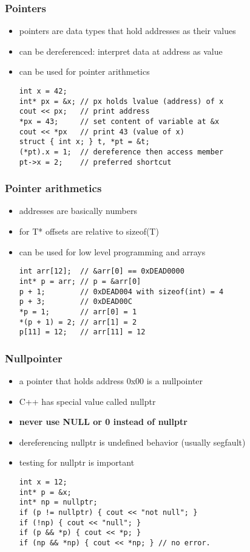 \begin{frame}[fragile]
    \frametitle{Pointers}
    \begin{itemize}
        \item pointers are data types that hold addresses as their values
        \item can be dereferenced: interpret data at address as value
        \item can be used for pointer arithmetics
        \begin{lstlisting}
int x = 42;
int* px = &x; // px holds lvalue (address) of x
cout << px;   // print address
*px = 43;     // set content of variable at &x
cout << *px   // print 43 (value of x)
struct { int x; } t, *pt = &t;
(*pt).x = 1;  // dereference then access member
pt->x = 2;    // preferred shortcut
        \end{lstlisting}
    \end{itemize}
\end{frame}

\begin{frame}[fragile]
    \frametitle{Pointer arithmetics}
    \begin{itemize}
        \item addresses are basically numbers
        \item for T* offsets are relative to sizeof(T)
        \item can be used for low level programming and arrays
        \begin{lstlisting}
int arr[12];  // &arr[0] == 0xDEAD0000
int* p = arr; // p = &arr[0]
p + 1;        // 0xDEAD004 with sizeof(int) = 4
p + 3;        // 0xDEAD00C
*p = 1;       // arr[0] = 1
*(p + 1) = 2; // arr[1] = 2
p[11] = 12;   // arr[11] = 12
        \end{lstlisting}
    \end{itemize}
\end{frame}

\begin{frame}[fragile]
    \frametitle{Nullpointer}
    \begin{itemize}
        \item a pointer that holds address 0x00 is a nullpointer
        \item C++ has special value called nullptr 
        \item \textbf{never use NULL or 0 instead of nullptr}
        \item dereferencing nullptr is undefined behavior (usually segfault)
        \item testing for nullptr is important
        \begin{lstlisting}
int x = 12;
int* p = &x;
int* np = nullptr;
if (p != nullptr) { cout << "not null"; }
if (!np) { cout << "null"; }
if (p && *p) { cout << *p; }
if (np && *np) { cout << *np; } // no error.
        \end{lstlisting}
    \end{itemize}
\end{frame}

